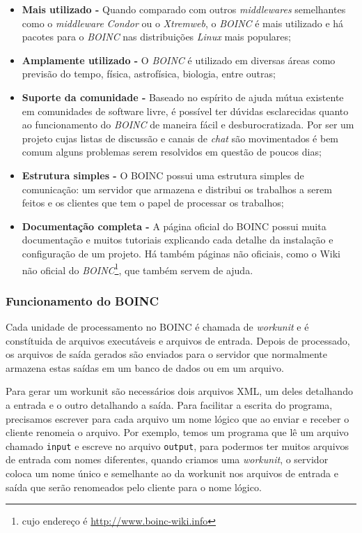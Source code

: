 \begin{itemize}
  \item \textbf{Mais utilizado -} Quando comparado com outros \emph{middlewares} semelhantes como o \textit{middleware} 
\emph{Condor} ou o \emph{Xtremweb}, o \emph{BOINC} é mais utilizado e há pacotes para o \emph{BOINC} nas 
distribuições \emph{Linux} mais populares;
  \item \textbf{Amplamente utilizado -} O \emph{BOINC} é utilizado em diversas áreas como previsão do tempo, física,
astrofísica, biologia, entre outras;
  \item \textbf{Suporte da comunidade -} Baseado no espírito de ajuda mútua existente em comunidades de software livre, é 
possível ter dúvidas esclarecidas quanto ao funcionamento do \emph{BOINC} de maneira fácil e desburocratizada. Por ser um projeto
cujas listas de discussão e canais de \textit{chat} são movimentados é bem comum alguns problemas serem resolvidos em questão de 
poucos dias;
  \item \textbf{Estrutura simples -} O BOINC possui uma estrutura simples de comunicação: um servidor que armazena e 
distribui os trabalhos a serem feitos e os clientes que tem o papel de processar os trabalhos;
  \item \textbf{Documentação completa -} A página oficial do BOINC possui muita do\-cu\-men\-ta\-ção e muitos tutoriais explicando
cada detalhe da instalação e configuração de um projeto. Há também páginas não oficiais, como o Wiki não oficial do \emph{BOINC}\footnote{cujo endereço é \url{http://www.boinc-wiki.info}},
que também servem de ajuda.
\end{itemize}



\subsubsection{Funcionamento do BOINC}


Cada unidade de processamento no BOINC é chamada de \emph{workunit} e é constítuida de arquivos executáveis e 
arquivos de entrada. Depois de processado, os arquivos de saída gerados são enviados para o servidor que
normalmente armazena estas saídas em um banco de dados ou em um arquivo.

Para gerar um workunit são necessários dois arquivos XML, um deles de\-ta\-lhan\-do a entrada e o 
outro detalhando a saída. Para facilitar a escrita do programa, precisamos escrever para cada arquivo um nome lógico 
que ao enviar e receber o cliente renomeia o arquivo. Por exemplo, temos um programa que lê um arquivo chamado 
\verb#input# e escreve no arquivo \verb#output#, para podermos ter muitos arquivos de entrada com nomes diferentes, quando
criamos uma \emph{workunit}, o servidor coloca um nome único e semelhante ao da workunit nos arquivos de entrada e saída que serão renomeados
pelo cliente para o nome lógico.

